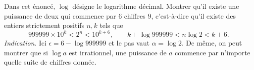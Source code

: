 Dans cet énoncé, $\log$ désigne le logarithme décimal. Montrer qu'il existe une puissance de deux qui commence par $6$ chiffres $9$, c'est-à-dire qu'il existe des entiers strictement positifs $n, k$ tels que
\[ 999999 \times 10^k < 2^n < 10^{k+6},\qquad k + \log 999999 < n\log 2 < k + 6. \]
\emph{Indication.} Ici $\epsilon = 6 - \log 999999$ et le pas vaut $\alpha = \log 2$. De même, on peut montrer que si $\log a$ est irrationnel, une puissance de $a$ commence par n'importe quelle suite de chiffres donnée.
